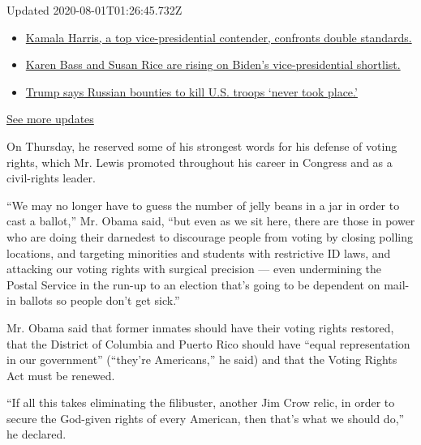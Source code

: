 Updated 2020-08-01T01:26:45.732Z

\begin{itemize}
\tightlist
\item
  \href{https://www.nytimes.com/2020/07/31/us/elections/biden-vs-trump.html?action=click\&pgtype=Article\&state=default\&region=MAIN_CONTENT_1\&context=storylines_live_updates\#link-29fdff45}{Kamala
  Harris, a top vice-presidential contender, confronts double
  standards.}
\item
  \href{https://www.nytimes.com/2020/07/31/us/elections/biden-vs-trump.html?action=click\&pgtype=Article\&state=default\&region=MAIN_CONTENT_1\&context=storylines_live_updates\#link-13ec3d9c}{Karen
  Bass and Susan Rice are rising on Biden's vice-presidential
  shortlist.}
\item
  \href{https://www.nytimes.com/2020/07/31/us/elections/biden-vs-trump.html?action=click\&pgtype=Article\&state=default\&region=MAIN_CONTENT_1\&context=storylines_live_updates\#link-49e9a016}{Trump
  says Russian bounties to kill U.S. troops `never took place.'}
\end{itemize}

\href{https://www.nytimes.com/2020/07/31/us/elections/biden-vs-trump.html?action=click\&pgtype=Article\&state=default\&region=MAIN_CONTENT_1\&context=storylines_live_updates}{See
more updates}

On Thursday, he reserved some of his strongest words for his defense of
voting rights, which Mr. Lewis promoted throughout his career in
Congress and as a civil-rights leader.

``We may no longer have to guess the number of jelly beans in a jar in
order to cast a ballot,'' Mr. Obama said, ``but even as we sit here,
there are those in power who are doing their darnedest to discourage
people from voting by closing polling locations, and targeting
minorities and students with restrictive ID laws, and attacking our
voting rights with surgical precision --- even undermining the Postal
Service in the run-up to an election that's going to be dependent on
mail-in ballots so people don't get sick.''

Mr. Obama said that former inmates should have their voting rights
restored, that the District of Columbia and Puerto Rico should have
``equal representation in our government'' (``they're Americans,'' he
said) and that the Voting Rights Act must be renewed.

``If all this takes eliminating the filibuster, another Jim Crow relic,
in order to secure the God-given rights of every American, then that's
what we should do,'' he declared.

